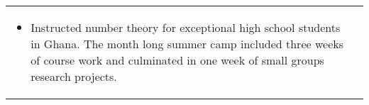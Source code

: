 \begin{center}
{\begin{longtable}{p{}  p{}}
        {\small
        \begin{itemize}
        \setlength{\parindent}{0em}
        \item[] Instructed number theory for exceptional high school students in Ghana. The month long summer camp included three weeks of course work and culminated in one week of small groups research projects.
        \end{itemize}
        }
        \vspace{-1em}
         
    \end{longtable}
    } 
    \end{center}

    \vspace{-1em}
    